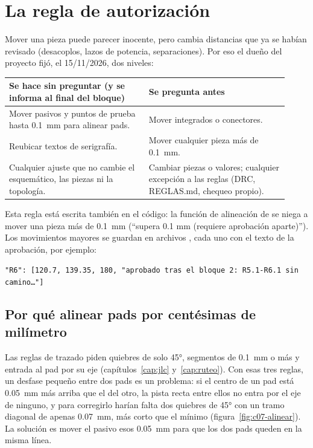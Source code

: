 \section{La regla de autorización}\label{sec:c07-autorizacion}

Mover una pieza puede parecer inocente, pero cambia distancias que ya se habían revisado (desacoplos, lazos de
potencia, separaciones). Por eso el dueño del proyecto fijó, el 15/11/2026, dos niveles:

\begin{center}
\begin{tabular}{@{}L{0.46\linewidth}L{0.46\linewidth}@{}}
\toprule
\textbf{Se hace sin preguntar (y se informa al final del bloque)} & \textbf{Se pregunta antes}\\
\midrule
Mover pasivos y puntos de prueba hasta \SI{0.1}{\milli\meter} para alinear pads. &
Mover integrados o conectores.\\
Reubicar textos de serigrafía. & Mover cualquier pieza más de \SI{0.1}{\milli\meter}.\\
Cualquier ajuste que no cambie el esquemático, las piezas ni la topología. &
Cambiar piezas o valores; cualquier excepción a las reglas (DRC, REGLAS.md, chequeo propio).\\
\bottomrule
\end{tabular}
\end{center}

Esta regla está escrita también en el código: la función de alineación de  se niega a mover una
pieza más de \SI{0.1}{\milli\meter} (``supera 0.1 mm (requiere aprobación aparte)''). Los movimientos mayores se
guardan en archivos , cada uno con el texto de la aprobación, por ejemplo:
\begin{center}
\texttt{"R6": [120.7, 139.35, 180, "aprobado tras el bloque 2: R5.1-R6.1 sin camino\dots"]}
\end{center}

\subsection*{Por qué alinear pads por centésimas de milímetro}
Las reglas de trazado piden quiebres de solo \ang{45}, segmentos de \SI{0.1}{\milli\meter} o más y entrada al pad
por su eje (capítulos~\ref{cap:jlc} y~\ref{cap:ruteo}). Con esas tres reglas, un desfase pequeño entre dos pads
es un problema: si el centro de un pad está \SI{0.05}{\milli\meter} más arriba que el del otro, la pista recta entre
ellos no entra por el eje de ninguno, y para corregirlo harían falta dos quiebres de \ang{45} con un tramo diagonal
de apenas \SI{0.07}{\milli\meter}, más corto que el mínimo (figura~\ref{fig:c07-alinear}). La solución es mover el
pasivo esos \SI{0.05}{\milli\meter} para que los dos pads queden en la misma línea.

